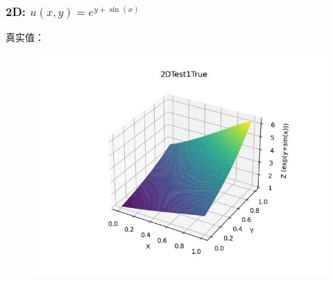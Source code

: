 \documentclass{article}
\begin{document}
\subsubsection{2D: $u(x,y)=e^{y+\sin(x)}$}
真实值：
\begin{figure}[h]
    \centering
    \includegraphics[width=0.7\linewidth]{2DTest1True.jpg}
\end{figure}
\end{document}
